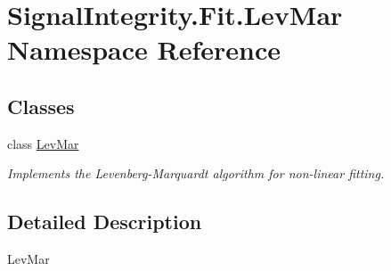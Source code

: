 \hypertarget{namespaceSignalIntegrity_1_1Fit_1_1LevMar}{}\section{Signal\+Integrity.\+Fit.\+Lev\+Mar Namespace Reference}
\label{namespaceSignalIntegrity_1_1Fit_1_1LevMar}
\subsection*{Classes}
\begin{DoxyCompactItemize}
\item 
class \hyperlink{classSignalIntegrity_1_1Fit_1_1LevMar_1_1LevMar}{Lev\+Mar}
\begin{DoxyCompactList}\small\item\em Implements the Levenberg-\/\+Marquardt algorithm for non-\/linear fitting. \end{DoxyCompactList}\end{DoxyCompactItemize}


\subsection{Detailed Description}
\begin{DoxyVerb}LevMar\end{DoxyVerb}
 